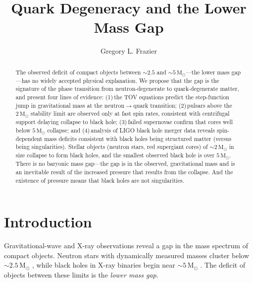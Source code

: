 \documentclass[manuscript,linenumbers]{aastex701}
\newcommand{\Msun}{\mathrm{M}_\odot}
\begin{document}
\title{Quark Degeneracy and the Lower Mass Gap}

\author[gname=Gregory,sname=Frazier]{Gregory L. Frazier}

\begin{abstract}
The observed deficit of compact objects between ${\sim}2.5$ and
${\sim}5\,\Msun$---the lower mass gap---has no widely
accepted physical explanation. We propose that the gap is the
signature of the phase transition from neutron-degenerate to
quark-degenerate matter, and present four lines of evidence:
(1)\,the TOV equations predict the step-function jump in gravitational
mass at the neutron$\rightarrow$quark transition;
(2)\,pulsars above the $2\,\Msun$ stability limit are observed
only at fast spin rates, consistent with centrifugal support delaying
collapse to black hole;
(3)\,failed supernovae confirm that cores well below $5\,\Msun$
collapse; and
(4)\,analysis of LIGO black hole merger data reveals spin-dependent mass
deficits consistent with black holes being structured matter (versus being singularities).
Stellar objects (neutron stars, red supergiant cores) of
${\sim}2\,\Msun$ in size collapse to form black holes, and
the smallest observed black hole is over $5\,\Msun$. There is
no baryonic mass gap---the gap is in the observed, gravitational mass
and is an inevitable result of the increased pressure that results
from the collapse. And the existence of pressure means that black
holes are not singularities.
\end{abstract}


\section{Introduction}\label{s:introduction}

Gravitational-wave and X-ray observations reveal a gap in the mass
spectrum of compact objects. Neutron stars with dynamically measured
masses cluster below ${\sim}2.5\,\Msun$ \citep{LattimerNSmasses},
while black holes in X-ray binaries begin near ${\sim}5\,\Msun$
\citep{Bailyn1998}.  The deficit of objects between these limits is
the \emph{lower mass gap}.
\end{document}
